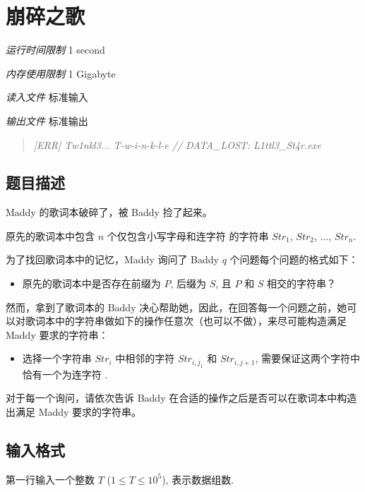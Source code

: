 \section[H. 崩碎之歌]{ 崩碎之歌}

\textit{运行时间限制}   1 second

\textit{内存使用限制} 1 Gigabyte

\textit{读入文件} \qquad 标准输入

\textit{输出文件} \qquad 标准输出

\begin{quote}
   \textit{[ERR] Tw1nkl3... T-w-i-n-k-l-e // DATA\_LOST: L1ttl3\_St4r.exe}
\end{quote}


\subsection{题目描述}

Maddy 的歌词本破碎了，被 Baddy 捡了起来。

原先的歌词本中包含 $n$ 个仅包含小写字母和连字符 \TT{-} 的字符串 $Str_1$, $Str_2$, $\ldots$, $Str_n$.

为了找回歌词本中的记忆，Maddy 询问了 Baddy $q$ 个问题每个问题的格式如下：

\begin{itemize}
   \item 原先的歌词本中是否存在前缀为 $P$, 后缀为 $S$, 且 $P$ 和 $S$ 相交的字符串？
\end{itemize}

然而，拿到了歌词本的 Baddy 决心帮助她，因此，在回答每一个问题之前，她可以对歌词本中的字符串做如下的操作任意次（也可以不做），来尽可能构造满足 Maddy 要求的字符串：

\begin{itemize}
   \item 选择一个字符串 $Str_i$ 中相邻的字符 $Str_{i, j_1}$ 和 $Str_{i, j + 1}$, 需要保证这两个字符中恰有一个为连字符 \TT{-}.
\end{itemize}

对于每一个询问，请依次告诉 Baddy 在合适的操作之后是否可以在歌词本中构造出满足 Maddy 要求的字符串。

\subsection{输入格式}

第一行输入一个整数 $T$ ($1 \le T \le 10^5$), 表示数据组数.

